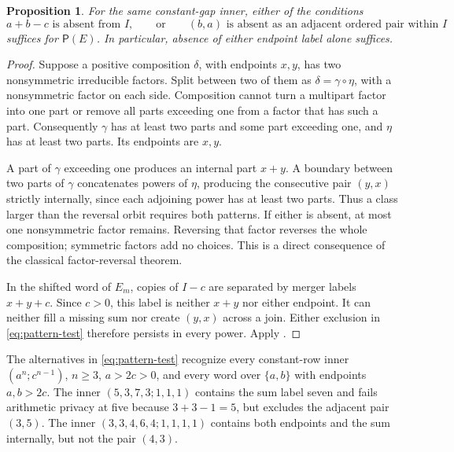 \documentclass[11pt,a4paper]{amsart}
\numberwithin{equation}{section}
\theoremstyle{plain}
\newtheorem{proposition}[theorem]{Proposition}
\theoremstyle{definition}
\begin{document}
\begin{proposition}\label{prop:pattern-recognition}
For the same constant-gap inner, either of the conditions
\begin{equation}\label{eq:pattern-test}
 a+b-c\text{ is absent from }I,
 \qquad\text{or}\qquad
 (b,a)\text{ is absent as an adjacent ordered pair within }I
\end{equation}
suffices for \(\mathsf P(E)\).  In particular, absence of either endpoint label alone suffices.
\end{proposition}
\begin{proof}
Suppose a positive composition \(\delta\), with endpoints \(x,y\), has two nonsymmetric irreducible factors.  Split between two of them as \(\delta=\gamma\circ\eta\), with a nonsymmetric factor on each side.  Composition cannot turn a multipart factor into one part or remove all parts exceeding one from a factor that has such a part.  Consequently \(\gamma\) has at least two parts and some part exceeding one, and \(\eta\) has at least two parts.  Its endpoints are \(x,y\).

A part of \(\gamma\) exceeding one produces an internal part \(x+y\).  A boundary between two parts of \(\gamma\) concatenates powers of \(\eta\), producing the consecutive pair \((y,x)\) strictly internally, since each adjoining power has at least two parts.  Thus a class larger than the reversal orbit requires both patterns.  If either is absent, at most one nonsymmetric factor remains.  Reversing that factor reverses the whole composition; symmetric factors add no choices.  This is a direct consequence of the classical factor-reversal theorem.

In the shifted word of \(E_m\), copies of \(I-c\) are separated by merger labels \(x+y+c\).  Since \(c>0\), this label is neither \(x+y\) nor either endpoint.  It can neither fill a missing sum nor create \((y,x)\) across a join.  Either exclusion in \eqref{eq:pattern-test} therefore persists in every power.  Apply .
\end{proof}

The alternatives in \eqref{eq:pattern-test} recognize every constant-row inner \((a^n;c^{n-1})\), \(n\ge3\), \(a>2c>0\), and every word over \(\{a,b\}\) with endpoints \(a,b>2c\).  The inner \((5,3,7,3;1,1,1)\) contains the sum label seven and fails arithmetic privacy at five because \(3+3-1=5\), but excludes the adjacent pair \((3,5)\).  The inner \((3,3,4,6,4;1,1,1,1)\) contains both endpoints and the sum internally, but not the pair \((4,3)\).
\end{document}
